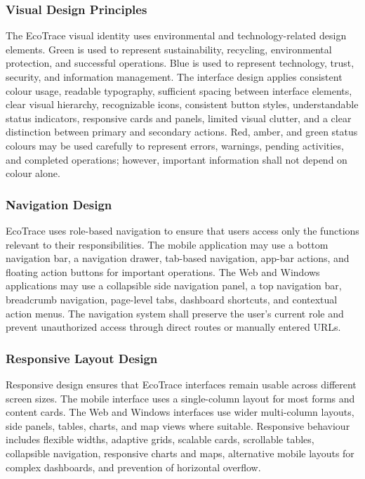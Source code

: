 \subsubsection{Visual Design Principles}
The EcoTrace visual identity uses environmental and technology-related
design elements. Green is used to represent sustainability, recycling,
environmental protection, and successful operations. Blue is used to represent
technology, trust, security, and information management. The interface
design applies consistent colour usage, readable typography, sufficient
spacing between interface elements, clear visual hierarchy, recognizable
icons, consistent button styles, understandable status indicators, responsive
cards and panels, limited visual clutter, and a clear distinction between
primary and secondary actions. Red, amber, and green status colours may be
used carefully to represent errors, warnings, pending activities, and completed
operations; however, important information shall not depend on colour alone.

\subsubsection{Navigation Design}
EcoTrace uses role-based navigation to ensure that users access only the
functions relevant to their responsibilities. The mobile application may use a
bottom navigation bar, a navigation drawer, tab-based navigation, app-bar
actions, and floating action buttons for important operations. The Web and
Windows applications may use a collapsible side navigation panel, a top
navigation bar, breadcrumb navigation, page-level tabs, dashboard shortcuts,
and contextual action menus. The navigation system shall preserve the user's
current role and prevent unauthorized access through direct routes or
manually entered URLs.

\subsubsection{Responsive Layout Design}
Responsive design ensures that EcoTrace interfaces remain usable across
different screen sizes. The mobile interface uses a single-column layout for
most forms and content cards. The Web and Windows interfaces use wider
multi-column layouts, side panels, tables, charts, and map views where
suitable. Responsive behaviour includes flexible widths, adaptive grids,
scalable cards, scrollable tables, collapsible navigation, responsive charts and
maps, alternative mobile layouts for complex dashboards, and prevention of
horizontal overflow.

